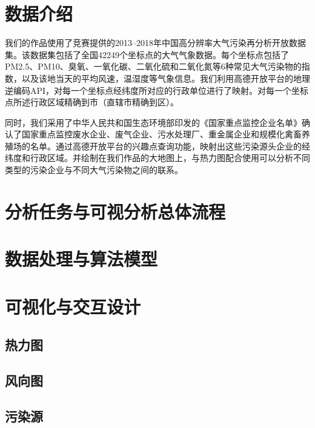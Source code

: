 \documentclass[UTF8]{ctexrep}
\begin{document}
    \section{数据介绍}

    我们的作品使用了竞赛提供的2013–2018年中国高分辨率大气污染再分析开放数据集。该数据集包括了全国42249个坐标点的大气气象数据。每个坐标点包括了PM2.5、PM10、臭氧、一氧化碳、二氧化硫和二氧化氮等6种常见大气污染物的指数，以及该地当天的平均风速，温湿度等气象信息。我们利用高德开放平台的地理逆编码API，对每一个坐标点经纬度所对应的行政单位进行了映射。对每一个坐标点所述行政区域精确到市（直辖市精确到区）。

    同时，我们采用了中华人民共和国生态环境部印发的《国家重点监控企业名单》确认了国家重点监控废水企业、废气企业、污水处理厂、重金属企业和规模化禽畜养殖场的名单。通过高德开放平台的兴趣点查询功能，映射出这些污染源头企业的经纬度和行政区域。并绘制在我们作品的大地图上，与热力图配合使用可以分析不同类型的污染企业与不同大气污染物之间的联系。

    \section{分析任务与可视分析总体流程}

    \section{数据处理与算法模型}

    \section{可视化与交互设计}

    \subsection{热力图}
    

    \subsection{风向图}

    \subsection{污染源}
\end{document}
